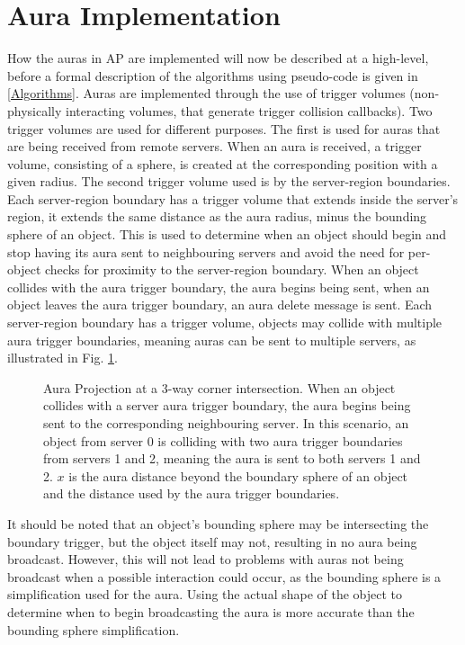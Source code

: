 \section{Aura Implementation}
How the auras in AP are implemented will now be described at a high-level, before a formal description of the algorithms using pseudo-code is given in \ref{Algorithms}.
Auras are implemented through the use of trigger volumes (non-physically interacting volumes, that generate trigger collision callbacks). Two trigger volumes are used for different purposes. 
The first is used for auras that are being received from remote servers. When an aura is received, a trigger volume, consisting of a sphere, is created at the corresponding position with a given radius. The second trigger volume used is by the server-region boundaries. Each server-region boundary has a trigger volume that extends inside the server's region, it extends the same distance as the aura radius, minus the bounding sphere of an object. This is used to determine when an object should begin and stop having its aura sent to neighbouring servers and avoid the need for per-object checks for proximity to the server-region boundary. When an object collides with the aura trigger boundary, the aura begins being sent, when an object leaves the aura trigger boundary, an aura delete message is sent.
Each server-region boundary has a trigger volume, objects may collide with multiple aura trigger boundaries, meaning auras can be sent to multiple servers, as illustrated in Fig. \ref{AuraCorner}.

\begin{figure}
	\centering
	\scalebox{0.75}{}
	\caption{Aura Projection at a 3-way corner intersection. When an object collides with a server aura trigger boundary, the aura begins being sent to the corresponding neighbouring server. In this scenario, an object from server 0 is colliding with two aura trigger boundaries from servers 1 and 2, meaning the aura is sent to both servers 1 and 2. $x$ is the aura distance beyond the boundary sphere of an object and the distance used by the aura trigger boundaries.}
	\label{AuraCorner}
\end{figure}

It should be noted that an object's bounding sphere may be intersecting the boundary trigger, but the object itself may not, resulting in no aura being broadcast. However, this will not lead to problems with auras not being broadcast when a possible interaction could occur, as the bounding sphere is a simplification used for the aura. Using the actual shape of the object to determine when to begin broadcasting the aura is more accurate than the bounding sphere simplification.

